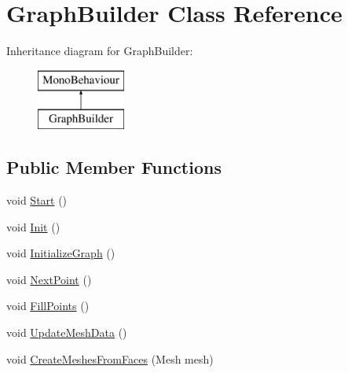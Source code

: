 \hypertarget{class_graph_builder}{}\section{Graph\+Builder Class Reference}
\label{class_graph_builder}
Inheritance diagram for Graph\+Builder\+:\begin{figure}[H]
\begin{center}
\leavevmode
\includegraphics[height=2.000000cm]{class_graph_builder}
\end{center}
\end{figure}
\subsection*{Public Member Functions}
\begin{DoxyCompactItemize}
\item 
void \mbox{\hyperlink{class_graph_builder_a8297aa8425e28706cebf248501a7ddd9}{Start}} ()
\item 
void \mbox{\hyperlink{class_graph_builder_aa6d73ad673971862998c257818424b15}{Init}} ()
\item 
void \mbox{\hyperlink{class_graph_builder_ae9977fd7ab38bdc105ffef8898e1aa99}{Initialize\+Graph}} ()
\item 
void \mbox{\hyperlink{class_graph_builder_a45ab6fb54d2778b4c9b3c02f5b8aaa92}{Next\+Point}} ()
\item 
void \mbox{\hyperlink{class_graph_builder_aa6347d6e481e9bc58f3378edd8f00cfa}{Fill\+Points}} ()
\item 
void \mbox{\hyperlink{class_graph_builder_af5ad417df74a878c05b2b3f0350603af}{Update\+Mesh\+Data}} ()
\item 
void \mbox{\hyperlink{class_graph_builder_a5f073a99b5be732e8ea1ac4f40858d41}{Create\+Meshes\+From\+Faces}} (Mesh mesh)
\end{DoxyCompactItemize}
